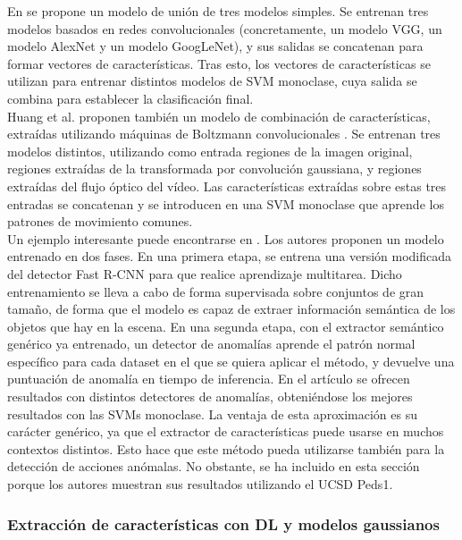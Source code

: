 \documentclass[../main.tex]{memoir}
\begin{document}
En \cite{singh2020crowd} se propone un modelo de unión de tres modelos
simples. Se entrenan tres modelos basados en redes convolucionales
(concretamente, un modelo VGG, un modelo AlexNet y un modelo
GoogLeNet), y sus salidas se concatenan para formar vectores de
características. Tras esto, los vectores de características se utilizan
para entrenar distintos modelos de SVM monoclase, cuya salida se combina
para establecer la clasificación final.\\

Huang et al. \cite{huang2018learning} proponen también un modelo de
combinación de características, extraídas utilizando máquinas de
Boltzmann convolucionales \cite{lee2009convolutional}. Se entrenan
tres modelos distintos, utilizando como entrada regiones de la imagen
original, regiones extraídas de la transformada por convolución
gaussiana, y regiones extraídas del flujo óptico del vídeo. Las
características extraídas sobre estas tres entradas se concatenan y se
introducen en una SVM monoclase que aprende los patrones de movimiento
comunes.\\

Un ejemplo interesante puede encontrarse en
\cite{hinami2017joint}. Los autores proponen un modelo entrenado en
dos fases. En una primera etapa, se entrena una versión modificada del
detector Fast R-CNN \cite{girshick2015fast} para que realice
aprendizaje multitarea. Dicho entrenamiento se lleva a cabo de forma
supervisada sobre conjuntos de gran tamaño, de forma que el modelo es
capaz de extraer información semántica de los objetos que hay en la
escena. En una segunda etapa, con el extractor semántico genérico ya
entrenado, un detector de anomalías aprende el patrón normal
específico para cada dataset en el que se quiera aplicar el método, y
devuelve una puntuación de anomalía en tiempo de inferencia. En el
artículo se ofrecen resultados con distintos detectores de anomalías,
obteniéndose los mejores resultados con las SVMs monoclase. La ventaja
de esta aproximación es su carácter genérico, ya que el extractor de
características puede usarse en muchos contextos distintos. Esto hace
que este método pueda utilizarse también para la detección de acciones
anómalas. No obstante, se ha incluido en esta sección porque los
autores muestran sus resultados utilizando el UCSD Peds1.

\subsubsection{Extracción de características con DL y modelos gaussianos}
\end{document}
